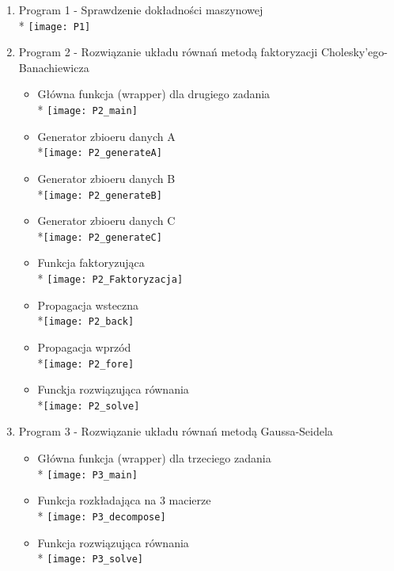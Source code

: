 \documentclass[a4paper, 11pt]{article}
\begin{document}
\begin{enumerate}
\begin{center}
\begin{enumerate}
	\item Program 1 - Sprawdzenie dokładności maszynowej \\*
	\texttt{[image: P1]}
	\item Program 2 - Rozwiązanie układu równań metodą faktoryzacji Cholesky'ego-Banachiewicza
	\begin{itemize}
	\item Główna funkcja (wrapper) dla drugiego zadania  \\* 	\texttt{[image: P2\_main]}	
	\item 	Generator zbioeru danych A \\*\texttt{[image: P2\_generateA]}
	\item 	Generator zbioeru danych B \\*\texttt{[image: P2\_generateB]}
	\item 	Generator zbioeru danych C \\*\texttt{[image: P2\_generateC]}
	\item 	Funkcja faktoryzująca \\* \texttt{[image: P2\_Faktoryzacja]}
	\item 	 Propagacja wsteczna\\*\texttt{[image: P2\_back]}
	\item 	Propagacja wprzód  \\*\texttt{[image: P2\_fore]}
	\item  Funckja rozwiązująca równania  \\*\texttt{[image: P2\_solve]}
\end{itemize}	
	\item Program 3 - Rozwiązanie układu równań metodą Gaussa-Seidela
	\begin{itemize}
	\item Główna funkcja (wrapper) dla trzeciego zadania  \\* 	
	\texttt{[image: P3\_main]}
	\item Funkcja rozkładająca na 3 macierze\\* \texttt{[image: P3\_decompose]}
	\item Funkcja rozwiązująca równania \\*	\texttt{[image: P3\_solve]}
	\end{itemize}
	\end{enumerate}
\end{center}





\end{enumerate}
\end{document}
